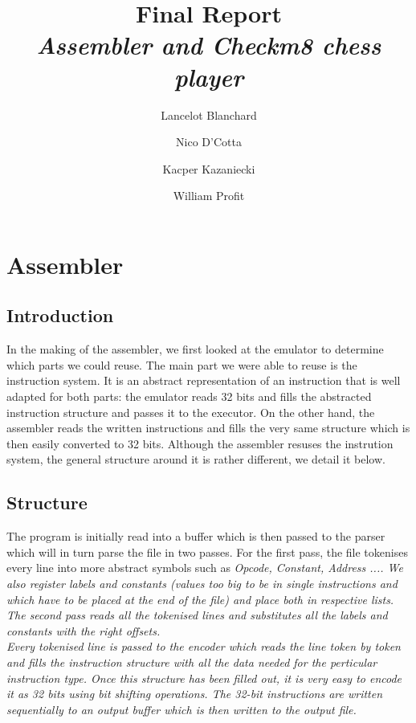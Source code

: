 \documentclass[11pt]{article}
\begin{document}
\title{Final Report\\
  \small{\em{Assembler and Checkm8 chess player}}}
\author{Lancelot Blanchard \and Nico D'Cotta \and Kacper Kazaniecki \and William Profit}

\maketitle

\section{Assembler}

\subsection{Introduction}

In the making of the assembler, we first looked at the emulator to determine
which parts we could reuse. The main part we were able to reuse is the
instruction system. It is an abstract representation of an instruction that is
well adapted for both parts: the emulator reads 32 bits and fills the abstracted
instruction structure and passes it to the executor. On the other hand, the
assembler reads the written instructions and fills the very same structure which
is then easily converted to 32 bits. Although the assembler resuses the
instrution system, the general structure around it is rather different, we
detail it below.

\subsection{Structure}

The program is initially read into a buffer which is then passed to the parser
which will in turn parse the file in two passes. For the first pass, the file
tokenises every line into more abstract symbols such as \em Opcode, Constant,
Address ...\em. We also register labels and constants (values too big to be in
single instructions and which have to be placed at the end of the file) and
place both in respective lists. The second pass reads all the tokenised lines
and substitutes all the labels and constants with the right offsets.\\

Every tokenised line is passed to the encoder which reads the line token by
token and fills the instruction structure with all the data needed for the
perticular instruction type. Once this structure has been filled out, it is very
easy to encode it as 32 bits using bit shifting operations. The 32-bit
instructions are written sequentially to an output buffer which is then written
to the output file.
\end{document}
